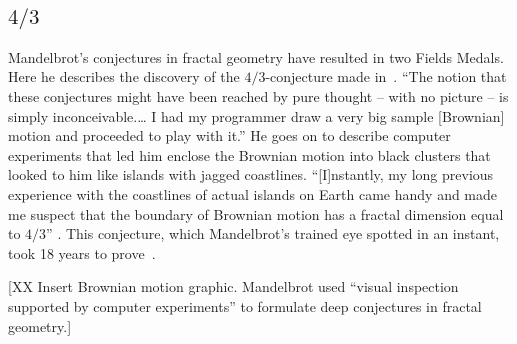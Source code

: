 \documentclass{llncs}
\begin{document}
\subsection{$4/3$}
Mandelbrot's conjectures in fractal geometry have resulted in two
Fields Medals.  Here he describes the discovery of the
$4/3$-conjecture made in~\cite{ManFN}.  
``The notion that these conjectures might have been reached by pure
  thought -- with no picture -- is simply inconceivable.\dots
I had my programmer draw a very big sample [Brownian] motion and
  proceeded to play with it.''
He goes on to describe computer experiments that led him
enclose the Brownian motion into black clusters that looked to him like islands with
jagged coastlines.
%
``[I]nstantly, my long previous experience with the coastlines of
  actual islands on Earth came handy and made me suspect that the
  boundary of Brownian motion has a fractal dimension equal to $4/3$''
\cite{Man}.
%
%
This conjecture, which  Mandelbrot's trained eye spotted in an instant,
took 18 years to prove~\cite{LSW01}.

[XX Insert Brownian motion graphic.  Mandelbrot used ``visual
inspection supported by computer experiments'' to formulate deep
conjectures in fractal geometry.]

%
%

\end{document}

